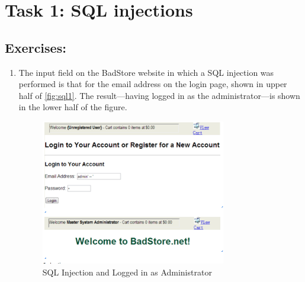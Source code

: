 \section*{Task 1: SQL injections}

\subsection*{Exercises:}
\begin{enumerate}
\item The input field on the BadStore website in which a SQL injection was performed is that for the email address on the login page, shown in upper half of \autoref{fig:sql1}. The result---having logged in as the administrator---is shown in the lower half of the figure.
\begin{figure}[h!]
	\caption{SQL Injection and Logged in as Administrator}
        \label{fig:sql1}
	\centering \includegraphics[height=2.5in]{sqli1}
\end{figure}
  

\end{enumerate}
